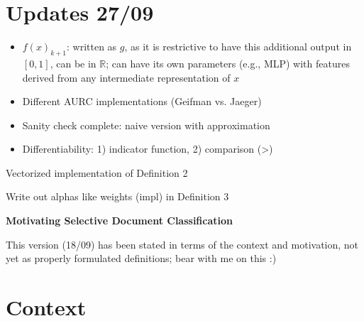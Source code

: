 \section*{Updates 27/09}

\begin{itemize} %
    \item $f(x)_{k+1}$: written as $g$, as it is restrictive to have this additional output in $[0,1]$, can be in $\mathbb{R}$; can have its own parameters (e.g., MLP) with features derived from any intermediate representation of $x$
    \item Different AURC implementations (Geifman vs. Jaeger)
    \item Sanity check complete: naive version with approximation
    \item Differentiability: 1) indicator function, 2) comparison (>)
\end{itemize}

\begin{todolist}
\item Vectorized implementation of Definition 2
\item Write out alphas like weights (impl) in Definition 3
\end{todolist}





\newpage

\begin{center}{\noindent\Large\bf Motivating Selective Document Classification}\end{center}

\begin{uuredbox}
This version (18/09) has been stated in terms of the context and motivation, not yet as properly formulated definitions; bear with me on this :) 
\end{uuredbox}

\section{Context}

